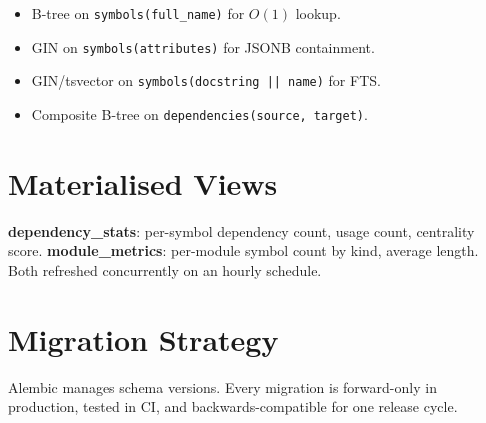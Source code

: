 \begin{itemize}
  \item B-tree on \texttt{symbols(full\_name)} for $O(1)$ lookup.
  \item GIN on \texttt{symbols(attributes)} for JSONB containment.
  \item GIN/tsvector on \texttt{symbols(docstring || name)} for FTS.
  \item Composite B-tree on \texttt{dependencies(source, target)}.
\end{itemize}

\section{Materialised Views}

\textbf{dependency\_stats}: per-symbol dependency count, usage count, centrality score.
\textbf{module\_metrics}: per-module symbol count by kind, average length.
Both refreshed concurrently on an hourly schedule.

\section{Migration Strategy}

Alembic manages schema versions.  Every migration is forward-only in
production, tested in CI, and backwards-compatible for one release cycle.

